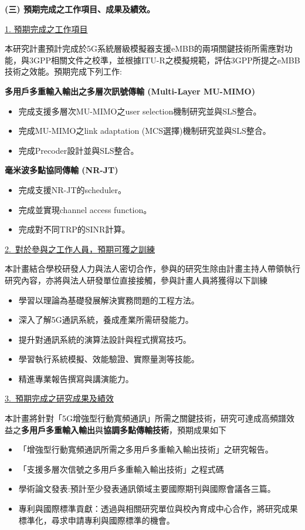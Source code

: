\documentclass[a4paper,12pt]{article}%
\begin{document}
\noindent \textbf{(三)	預期完成之工作項目、成果及績效。}

\noindent \underline{1. 預期完成之工作項目}

本研究計畫預計完成於5G系統層級模擬器支援eMBB的兩項關鍵技術所需應對功能，與3GPP相關文件之校準，並根據ITU-R之模擬規範，評估3GPP所提之eMBB技術之效能。預期完成下列工作:

\noindent \textbf{多用戶多重輸入輸出之多層次訊號傳輸 (Multi-Layer MU-MIMO)}
\begin{itemize}[noitemsep]

   \item 完成支援多層次MU-MIMO之user selection機制研究並與SLS整合。
   \item 完成MU-MIMO之link adaptation (MCS選擇)機制研究並與SLS整合。
   \item 完成Precoder設計並與SLS整合。
\end{itemize}

\noindent \textbf{毫米波多點協同傳輸 (NR-JT)}
\begin{itemize}[noitemsep]
\item 完成支援NR-JT的scheduler。
\item 完成並實現channel access function。
\item 完成對不同TRP的SINR計算。
\end{itemize}




\noindent \underline{2.~對於參與之工作人員，預期可獲之訓練}

本計畫結合學校研發人力與法人密切合作，參與的研究生除由計畫主持人帶領執行研究內容，亦將與法人研發單位直接接觸，參與計畫人員將獲得以下訓練

\begin{itemize}[noitemsep]
\item 學習以理論為基礎發展解決實務問題的工程方法。
\item 深入了解5G通訊系統，養成產業所需研發能力。
\item 提升對通訊系統的演算法設計與程式撰寫技巧。
\item 學習執行系統模擬、效能驗證、實際量測等技能。
\item 精進專業報告撰寫與講演能力。
\end{itemize}

\vspace{1em}%

\noindent \underline{3.~預期完成之研究成果及績效}

本計畫將針對「5G增強型行動寬頻通訊」所需之關鍵技術，研究可達成高頻譜效益之\textbf{多用戶多重輸入輸出}與\textbf{協調多點傳輸技術}，預期成果如下
\begin{itemize}[noitemsep]
 \item 「增強型行動寬頻通訊所需之多用戶多重輸入輸出技術」之研究報告。
 \item 「支援多層次信號之多用戶多重輸入輸出技術」之程式碼
 \item 學術論文發表:預計至少發表通訊領域主要國際期刊與國際會議各三篇。
 \item 專利與國際標準貢獻：透過與相關研究單位與校內育成中心合作，將研究成果標準化，尋求申請專利與國際標準的機會。
\end{itemize}
\end{document}
